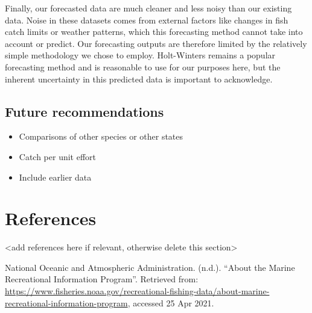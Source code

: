 \documentclass[
  12pt,
]{article}
\providecommand{\tightlist}{%
  \setlength{\itemsep}{0pt}\setlength{\parskip}{0pt}}
\begin{document}
Finally, our forecasted data are much cleaner and less noisy than our
existing data. Noise in these datasets comes from external factors like
changes in fish catch limits or weather patterns, which this forecasting
method cannot take into account or predict. Our forecasting outputs are
therefore limited by the relatively simple methodology we chose to
employ. Holt-Winters remains a popular forecasting method and is
reasonable to use for our purposes here, but the inherent uncertainty in
this predicted data is important to acknowledge.

\hypertarget{future-recommendations}{%
\subsection{Future recommendations}\label{future-recommendations}}

\begin{itemize}
\tightlist
\item
  Comparisons of other species or other states
\item
  Catch per unit effort
\item
  Include earlier data
\end{itemize}

\newpage

\hypertarget{references}{%
\section{References}\label{references}}

\textless add references here if relevant, otherwise delete this
section\textgreater{}

National Oceanic and Atmospheric Administration. (n.d.). ``About the
Marine Recreational Information Program''. Retrieved from:
\url{https://www.fisheries.noaa.gov/recreational-fishing-data/about-marine-recreational-information-program},
accessed 25 Apr 2021.
\end{document}
